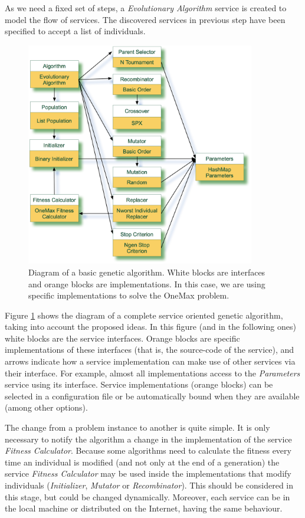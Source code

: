  As we need a fixed set of steps, a {\em Evolutionary Algorithm} service is created to model the flow of services. The discovered services in previous step have been specified to accept  a list of individuals. %

  

\begin{figure}
\centering
\includegraphics[width=10cm]{gfx/soaea/basicga.jpg}
\caption{Diagram of a basic genetic algorithm. White blocks are interfaces and orange blocks are implementations. In this case, we are using specific implementations to solve the OneMax problem.}
\label{BASICGAEXAMPLE}
\end{figure}





Figure \ref{BASICGAEXAMPLE} shows the diagram of a complete service oriented genetic algorithm, taking into account the proposed ideas. In this figure (and in the following ones) white blocks are the service interfaces. Orange blocks are specific implementations of these interfaces (that is, the source-code of the service), and  arrows indicate how a service implementation can make use of other services via their interface. For example, almost all implementations access to the {\em Parameters} service using its interface. Service implementations (orange blocks) can be selected in a configuration file or be automatically bound when they are available (among other options).



 The change from a problem instance to another is quite simple. It is only necessary to notify the algorithm a change in the implementation of the service {\em Fitness Calculator}. Because some algorithms need to calculate the fitness every time an individual is modified (and not only at the end of a generation) the service {\em Fitness Calculator} may be used inside the implementations that modify individuals ({\em Initializer}, {\em Mutator} or {\em Recombinator}). This should be considered in this stage, but could be changed dynamically. Moreover, each service can be in the local machine or distributed on the Internet, having the same behaviour.  %

